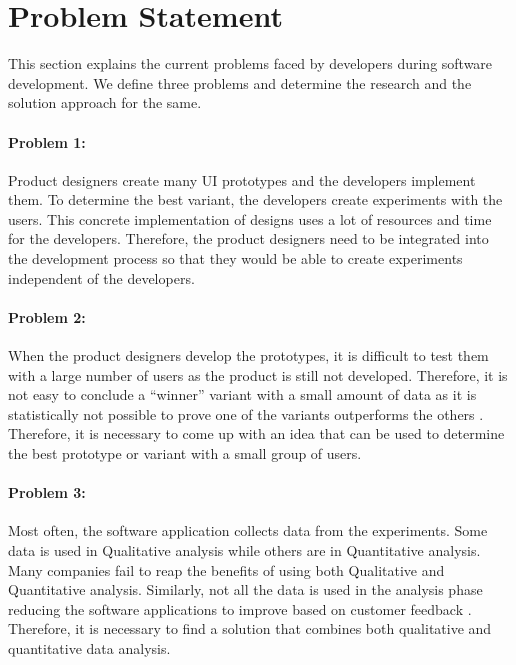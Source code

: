 \section{Problem Statement}
\label{intro:section:problems}
This section explains the current problems faced by developers during software development. 
We define three problems and determine the research and the solution approach for the same.

\paragraph{Problem 1:} Product designers create many UI prototypes and the developers implement them.
To determine the best variant, the developers create experiments with the users. 
This concrete implementation of designs uses a lot of resources and time for the developers.
Therefore, the product designers need to be integrated into the development process so that they would be able to create experiments independent of the developers.


\paragraph{Problem 2:} When the product designers develop the prototypes, it is difficult to test them with a large number of users as the product is still not developed.
Therefore, it is not easy to conclude a ``winner'' variant with a small amount of data as it is statistically not possible to prove one of the variants outperforms the others \cite{article:usability:smalldata}.
Therefore, it is necessary to come up with an idea that can be used to determine the best prototype or variant with a small group of users.

\paragraph{Problem 3:} Most often, the software application collects data from the experiments. 
Some data is used in Qualitative analysis while others are in Quantitative analysis.
Many companies fail to reap the benefits of using both Qualitative and Quantitative analysis.
Similarly, not all the data is used in the analysis phase reducing the software applications to improve based on customer feedback \cite{article:datadrive:brian}.
Therefore, it is necessary to find a solution that combines both qualitative and quantitative data analysis.

